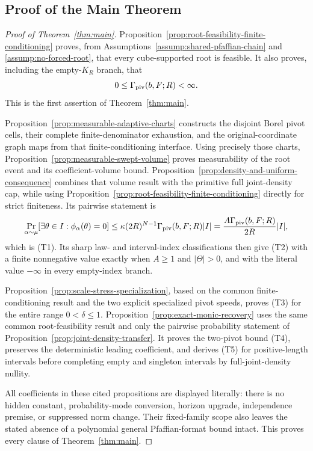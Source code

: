 \subsection{Proof of the Main Theorem}

\begin{proof}[Proof of Theorem~\ref{thm:main}]
Proposition~\ref{prop:root-feasibility-finite-conditioning} proves, from
Assumptions~\ref{assump:shared-pfaffian-chain} and
\ref{assump:no-forced-root}, that every cube-supported root is feasible.  It
also proves, including the empty-$K_R$ branch, that
\[
0\leq\Gamma_{\rm piv}(b,F;R)<\infty.
\]
This is the first assertion of Theorem~\ref{thm:main}.

Proposition~\ref{prop:measurable-adaptive-charts} constructs the disjoint
Borel pivot cells, their complete finite-denominator exhaustion, and the
original-coordinate graph maps from that finite-conditioning interface.
Using precisely those charts, Proposition~\ref{prop:measurable-swept-volume}
proves measurability of the root event and its coefficient-volume bound.
Proposition~\ref{prop:density-and-uniform-consequence} combines that volume
result with the primitive full joint-density cap, while using
Proposition~\ref{prop:root-feasibility-finite-conditioning} directly for
strict finiteness.  Its pairwise statement is
\[
\Pr_{\alpha\sim\mu}[\exists\theta\in I:\phi_\alpha(\theta)=0]
\leq\kappa(2R)^{N-1}\Gamma_{\rm piv}(b,F;R)|I|
=\frac{A\Gamma_{\rm piv}(b,F;R)}{2R}|I|,
\]
which is \textup{(T1)}.  Its sharp law- and interval-index classifications
then give \textup{(T2)} with a finite nonnegative value exactly when
$A\geq1$ and $|\Theta|>0$, and with the literal value $-\infty$ in every
empty-index branch.

Proposition~\ref{prop:scale-stress-specialization}, based on the common
finite-conditioning result and the two explicit specialized pivot speeds,
proves \textup{(T3)} for the entire range $0<\delta\leq1$.
Proposition~\ref{prop:exact-monic-recovery} uses the same common
root-feasibility result and only the pairwise probability statement of
Proposition~\ref{prop:joint-density-transfer}.  It proves the two-pivot
bound \textup{(T4)}, preserves the deterministic leading coefficient, and
derives \textup{(T5)} for positive-length intervals before completing empty
and singleton intervals by full-joint-density nullity.

All coefficients in these cited propositions are displayed literally:
there is no hidden constant, probability-mode conversion, horizon upgrade,
independence premise, or suppressed norm change.  Their fixed-family scope
also leaves the stated absence of a polynomial general Pfaffian-format
bound intact.  This proves every clause of Theorem~\ref{thm:main}.
\end{proof}
